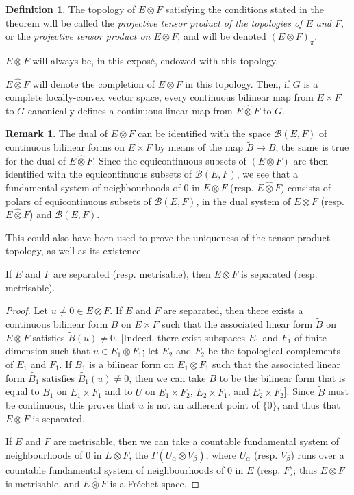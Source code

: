 \documentclass{article}
\theoremstyle{plain}
\newenvironment{proposition}[1]
    {\renewcommand\theinnercustomproposition{#1}\innercustomproposition}
    {\endinnercustomproposition}
\theoremstyle{definition}
\newtheorem*{remark}{Remark}
\newtheorem*{definition}{Definition}
\newcommand{\BB}{\mathcal{B}}
\newcommand{\cotimes}{\widehat{\otimes}}
\newcommand{\oldpage}[1]{\marginpar{\footnotesize$\Big\vert$ \textit{p.~#1}}}
\begin{document}
\begin{definition}
  The topology of $E\otimes F$ satisfying the conditions stated in the theorem will be called the \emph{projective tensor product of the topologies of $E$ and $F$}, or the \emph{projective tensor product on $E\otimes F$}, and will be denoted $(E\otimes F)_\pi$.

  $E\otimes F$ will always be, in this expos\'{e}, endowed with this topology.

  $E\cotimes F$ will denote the completion of $E\otimes F$ in this topology.
  Then, if $G$ is a complete locally-convex vector space, every continuous bilinear map from $E\times F$ to $G$ canonically defines a continuous linear map from $E\cotimes F$ to $G$.
\end{definition}

\begin{remark}
  The dual of $E\otimes F$ can be identified with the space $\BB(E,F)$ of continuous bilinear forms on $E\times F$ by means of the map $\widetilde{B}\mapsto B$;
  the same is true for the dual of $E\cotimes F$.
  Since the equicontinuous subsets of $(E\otimes F)$ are then identified with the equicontinuous subsets of $\BB(E,F)$, we see that a fundamental system of neighbourhoods of $0$ in $E\otimes F$ (resp. $E\cotimes F$) consists of polars of equicontinuous subsets of $\BB(E,F)$, in the dual system of $E\otimes F$ (resp. $E\cotimes F$) and $\BB(E,F)$.
\end{remark}

\oldpage{3}
This could also have been used to prove the uniqueness of the tensor product topology, as well as its existence.

\begin{proposition}{2}
\label{proposition2}
  If $E$ and $F$ are separated (resp. metrisable), then $E\otimes F$ is separated (resp. metrisable).
\end{proposition}

\begin{proof}
  Let $u\neq0\in E\otimes F$.
  If $E$ and $F$ are separated, then there exists a continuous bilinear form $B$ on $E\times F$ such that the associated linear form $\widetilde{B}$ on $E\otimes F$ satisfies $\widetilde{B}(u)\neq0$.
  [Indeed, there exist subspaces $E_1$ and $F_1$ of finite dimension such that $u\in E_1\otimes F_1$;
  let $E_2$ and $F_2$ be the topological complements of $E_1$ and $F_1$.
  If $B_1$ is a bilinear form on $E_1\otimes F_1$ such that the associated linear form $\widetilde{B_1}$ satisfies $\widetilde{B_1}(u)\neq0$, then we can take $B$ to be the bilinear form that is equal to $B_1$ on $E_1\times F_1$ and to $U$ on $E_1\times F_2$, $E_2\times F_1$, and $E_2\times F_2$].
  Since $\widetilde{B}$ must be continuous, this proves that $u$ is not an adherent point of $\{0\}$, and thus that $E\otimes F$ is separated.

  If $E$ and $F$ are metrisable, then we can take a countable fundamental system of neighbourhoods of $0$ in $E\otimes F$, the $\Gamma(U_\alpha\otimes V_\beta)$, where $U_\alpha$ (resp. $V_\beta$) runs over a countable fundamental system of neighbourhoods of $0$ in $E$ (resp. $F$);
  thus $E\otimes F$ is metrisable, and $E\cotimes F$ is a Fr\'{e}chet space.
\end{proof}
\end{document}
